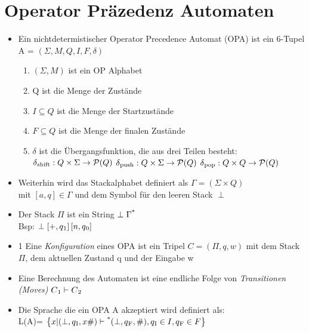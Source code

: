 \documentclass[
10pt,
pantone315, 	%
]{beamer}
\begin{document}
\section{Operator Präzedenz Automaten}
\begin{frame}[t]{\subsecname}
	\begin{itemize}[<+->]
		\item
		Ein nichtdetermistischer Operator Precedence Automat (OPA) ist ein 6-Tupel A = $(\Sigma, M, Q, I, F, \delta)$
		\begin{enumerate}
			\item
			$(\Sigma, M)$ ist ein OP Alphabet
			\item
			Q ist die Menge der Zustände
			\item
			$ I \subseteq Q$ ist die Menge der Startzustände
			\item
			$ F \subseteq Q$ ist die Menge der finalen Zustände
			\item 
			$\delta$ ist die Übergangsfunktion, die aus drei Teilen besteht: \\
			$\delta \textsubscript{shift}: Q \times \Sigma \rightarrow \mathcal{P} (Q)$
			$\delta \textsubscript{push}: Q \times \Sigma \rightarrow \mathcal{P} (Q)$
			$\delta \textsubscript{pop}: Q \times Q \rightarrow \mathcal{P} (Q)$
		\end{enumerate}
		\item
		Weiterhin wird das Stackalphabet definiert als $\Gamma = (\Sigma \times Q)$\\
		mit $\left[a , q \right]\in \Gamma$ und dem Symbol für den leeren Stack ${\perp}$
		\item
		Der Stack $\Pi$ ist ein String $\perp \Gamma \textsuperscript{*}$ \\
		Bsp: $\perp \left[+, q \textsubscript{1} \right] \left[ n, q \textsubscript{0} \right]$
	\end{itemize}
\end{frame}

\begin{frame}[t]{\subsecname}
	\begin{itemize}[<+->]
		\item
1		Eine \textit{Konfiguration} eines OPA ist ein Tripel $C = (\Pi, q, w)$ mit dem Stack $\Pi$, dem aktuellen Zustand q und der Eingabe w
		\item Eine Berechnung des Automaten ist eine endliche Folge von \textit{Transitionen (Moves)} $C \textsubscript{1} \vdash C \textsubscript{2}$
		\item
		Die Sprache die ein OPA A akzeptiert wird definiert als: \\
		L(A)= $\left\{x|(\perp, q \textsubscript{I}, x\#) \vdash \textsuperscript{*} ( \perp, q \textsubscript{F}, \#) ,
		q \textsubscript{I} \in I, q \textsubscript{F} \in F \right\}$
	\end{itemize}
\end{frame}
\end{document}
